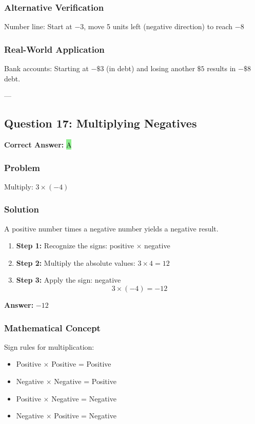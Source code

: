 \documentclass[12pt]{article}
\begin{document}
\subsubsection*{Alternative Verification}
Number line: Start at $-3$, move 5 units left (negative direction) to reach $-8$ 

\subsubsection*{Real-World Application}
Bank accounts: Starting at $-\$3$ (in debt) and losing another $\$5$ results in $-\$8$ debt.

---

\subsection{Question 17: Multiplying Negatives}

\textbf{Correct Answer: } \colorbox{lightgreen}{A}

\subsubsection*{Problem}
Multiply: $3 \times (-4)$

\subsubsection*{Solution}

A positive number times a negative number yields a negative result.

\begin{enumerate}
\item \textbf{Step 1:} Recognize the signs: positive $\times$ negative
\item \textbf{Step 2:} Multiply the absolute values: $3 \times 4 = 12$
\item \textbf{Step 3:} Apply the sign: negative
  \[
  3 \times (-4) = -12
  \]
\end{enumerate}

\textbf{Answer: } $-12$

\subsubsection*{Mathematical Concept}
Sign rules for multiplication:
\begin{itemize}
\item Positive $\times$ Positive = Positive
\item Negative $\times$ Negative = Positive
\item Positive $\times$ Negative = Negative
\item Negative $\times$ Positive = Negative
\end{itemize}
\end{document}
